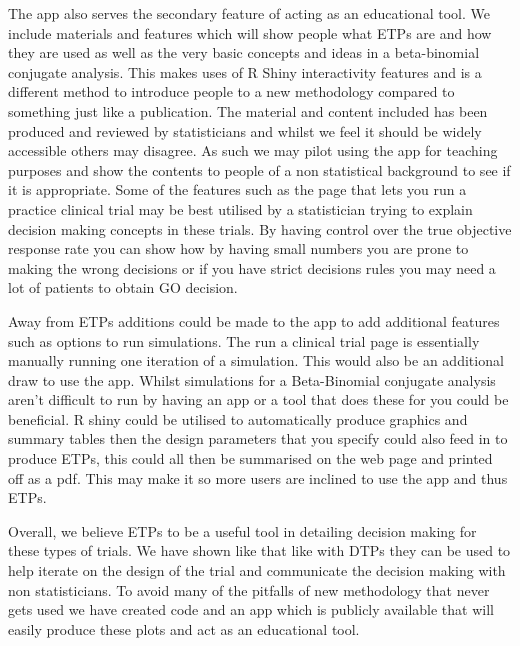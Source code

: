 The app also serves the secondary feature of acting as an educational tool. We include materials and features which will show people  what ETPs are and how they are used as well as the very basic concepts and ideas in a beta-binomial conjugate analysis. This makes uses of R Shiny interactivity features and is a different method to introduce people to a new methodology compared to something just like a publication. The material and content included has been produced and reviewed by statisticians and whilst we feel it should be widely accessible others may disagree. As such we may pilot using the app for teaching purposes and show the contents to people of a non statistical background to see if it is appropriate. Some of the features such as the page that lets you run a practice clinical trial may be best utilised by a statistician trying to explain decision making concepts in these trials. By having control over the true objective response rate you can show how by having small numbers you are prone to making the wrong decisions or if you have strict decisions rules you may need a lot of patients to obtain GO decision. 

Away from ETPs additions could be made to the app to add additional features such as options to run simulations. The run a clinical trial page is essentially manually running one iteration of a simulation. This would also be an additional draw to use the app. Whilst simulations for a Beta-Binomial conjugate analysis aren't difficult to run by having an app or a tool that does these for you could be beneficial. R shiny could be utilised to automatically produce graphics and summary tables then the design parameters that you specify could also feed in to produce ETPs, this could all then be summarised on the web page and printed off as a pdf. This may make it so more users are inclined to use the app and thus ETPs. 

Overall, we believe ETPs to be a useful tool in detailing decision making for these types of trials. We have shown like that like with DTPs they can be used to help iterate on the design of the trial and communicate the decision making with non statisticians. To avoid many of the pitfalls of new methodology that never gets used we have created code and an app which is publicly available that will easily produce these plots and act as an educational tool. 
